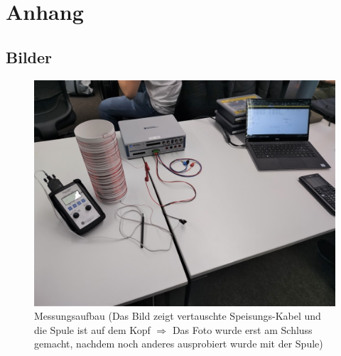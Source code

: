 \documentclass[11pt,a4paper]{article}
\begin{document}
\section{Anhang}
\subsection{Bilder}
\begin{figure}[h]
  \centering
  \includegraphics[scale=0.55]{assets/IMG_20220318_113714.jpg}
  \caption{Messungsaufbau (Das Bild zeigt vertauschte Speisungs-Kabel und die Spule ist auf dem Kopf $\Rightarrow$ Das Foto wurde erst am Schluss gemacht, nachdem noch anderes ausprobiert wurde mit der Spule)}
  \label{<label>}
\end{figure}
\end{document}
